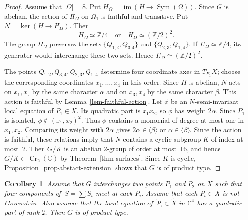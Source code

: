\documentclass[11pt]{amsart}
\numberwithin{equation}{section}
\newtheorem{corollary}[thm]{Corollary}
\theoremstyle{definition}
\theoremstyle{remark}
\DeclareMathOperator{\Cr}{Cr}
\begin{document}
\begin{proof}
Assume that $|\Omega|=8$. Put $H_\Omega=\operatorname{im}(H\to\operatorname{Sym}(\Omega))$. Since $G$ is abelian, the action of $H_\Omega$ on $\Omega_1$ is faithful and transitive. Put $N=\ker(H\to H_\Omega)$. Then
\[
H_\Omega\simeq\mathbb Z/4
\quad\text{or}\quad
H_\Omega\simeq(\mathbb Z/2)^2.
\]
The group $H_\Omega$ preserves the sets $\{Q_{1,2},Q_{3,4}\}$ and $\{Q_{2,3},Q_{1,4}\}$. If $H_\Omega\simeq\mathbb Z/4$, its generator would interchange these two sets. Hence $H_\Omega\simeq(\mathbb Z/2)^2$.

The points $Q_{1,2},Q_{3,4},Q_{2,3},Q_{1,4}$ determine four coordinate axes in $T_{P_1}X$; choose the corresponding coordinates $x_1,\ldots,x_4$ in this order. Since $H$ is abelian, $N$ acts on $x_1,x_2$ by the same character $\alpha$ and on $x_3,x_4$ by the same character $\beta$. This action is faithful by Lemma~\ref{lem-faithful-action}. Let $\phi$ be an $N$-semi-invariant local equation of $P_1\in X$. Its quadratic part is $x_1x_2$, so $\phi$ has weight $2\alpha$. Since $P_1$ is isolated, $\phi\notin(x_1,x_2)^2$. Thus $\phi$ contains a monomial of degree at most one in $x_1,x_2$. Comparing its weight with $2\alpha$ gives $2\alpha\in\langle\beta\rangle$ or $\alpha\in\langle\beta\rangle$.
Since the action is faithful, these relations imply that $N$ contains a cyclic subgroup $K$ of index at most~$2$. Then $G/K$ is an abelian $2$-group of order at most~$16$, and hence $G/K\subset\Cr_2(\mathbb C)$ by Theorem~\ref{thm-surfaces}. Since $K$ is cyclic, Proposition~\ref{prop-abstact-extension} shows that $G$ is of product type.
\color{black}
\end{proof}

\begin{corollary}
\label{prop-lc-gorenstein-4comp-3}
Assume that $G$ interchanges two points $P_1$ and $P_2$ on $X$ such that four components of\, $S=\sum S_i$ meet at each $P_i$.  Assume that each $P_i\in X$ is not Gorenstein.  Also assume that the local equation of\, $\widetilde{P}_i\in \widetilde{X}$ in $\mathbb{C}^4$ has a quadratic part of rank $2$.  Then $G$ is of product type.
\end{corollary}
\end{document}
